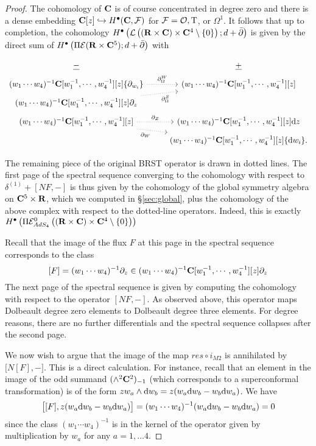 \documentclass[../main.tex]{subfiles}
\begin{document}
\begin{proof}
The cohomology of $\mathbf{C}$ is of course concentrated in degree zero and there is a dense embedding $\mathbf{C}[z] \hookrightarrow H^\bullet(\mathbf{C}, \mathcal{F})$ for $\mathcal{F} = \mathcal{O}, {\mathrm{T}}$, or $\Omega^1$. It follows that up to completion, the cohomology $H^\bullet \left ( \mathcal{L} \left ( (\mathbf{R}\times \mathbf{C}) \times \mathbf{C}^4\setminus \{0\} \right ); d+\bar{\partial} \right )$ is given by the direct sum of $H^\bullet \left ( \Pi \mathcal{E}  (\mathbf{R}\times \mathbf{C}^5 ); d+\bar{\partial} \right )$ with

\begin{equation}
  \label{eqn:ads4ss2} 
   \begin{tikzcd}[row sep = 1 ex]
    \ul{-} & \ul{+} \\
(w_1\cdots w_4)^{-1}\C[w_1^{-1},\cdots, w_4^{-1}][z] \{\partial_{w_i}\}  \ar[r, dotted, "\div^W"] & (w_1\cdots w_4)^{-1}\C[w_1^{-1},\cdots, w_4^{-1}] [z] \\
(w_1\cdots w_4)^{-1}\C[w_1^{-1},\cdots, w_4^{-1}] [z] \partial_z \ar[ur, dotted, "\div^Z"'] \\
(w_1\cdots w_4)^{-1}\C[w_1^{-1},\cdots, w_4^{-1}] [z] \ar[r, dotted, "\del_Z"] \ar[dr, dotted, "\del_W"'] & (w_1\cdots w_4)^{-1}\C[w_1^{-1},\cdots, w_4^{-1}][z] \d z \\ & (w_1\cdots w_4)^{-1}\C[w_1^{-1},\cdots, w_4^{-1}][z] \{\d w_i\} .
\end{tikzcd}
\end{equation}

The remaining piece of the original BRST operator is drawn in dotted lines. 
The first page of the spectral sequence converging to the cohomology with respect to $\delta^{(1)} + [N F, -]$ is thus given by the cohomology of the global symmetry algebra on $\mathbf{C}^5 \times \mathbf{R}$, which we computed in \S \ref{sec:global}, plus the cohomology of the above complex with respect to the dotted-line operators. Indeed, this is exactly $H^\bullet \left ( \Pi \mathcal{E}^0_{AdS_4} \left ( (\mathbf{R}\times \mathbf{C}) \times \mathbf{C}^4\setminus \{0\} \right ) \right )$

Recall that the image of the flux $F$ at this page in the spectral sequence corresponds to the class 
\[
[F] = (w_1 \cdots w_4)^{-1} \partial_z \in (w_1\cdots w_4)^{-1}\mathbf{C}[w_1^{-1},\cdots, w_4^{-1}] [z] \partial_z
\]
The next page of the spectral sequence is given by computing the cohomology with respect to the operator $[N F,-]$. 
As observed above, this operator maps Dolbeault degree zero elements to Dolbeault degree three elements. 
For degree reasons, there are no further differentials and the spectral sequence collapses after the second page. 

We now wish to argue that the image of the map $res\circ i_{M2}$ is annihilated by $\big[ N [F] , - \big]$. This is a direct calculation. For instance, recall that an element in the image of the odd summand $(\wedge^2 \mathbf{C}^2)_{-1}$ (which corresponds to a superconformal transformation) is of the form $z w_a \wedge \mathrm{d} w_b = z(w_a \mathrm{d} w_b - w_b \mathrm{d} w_a)$. 
We have
\[
\big[[F] , z(w_a \mathrm{d} w_b - w_b \mathrm{d} w_a) \big] = (w_1\cdots w_4)^{-1} (w_a \mathrm{d} w_b - w_b \mathrm{d} w_a) = 0
\]
since the class $(w_1\cdots w_4)^{-1}$ is in the kernel of the operator given by multiplication by $w_a$ for any $a = 1,\ldots 4$. 
\end{proof}
\end{document}
